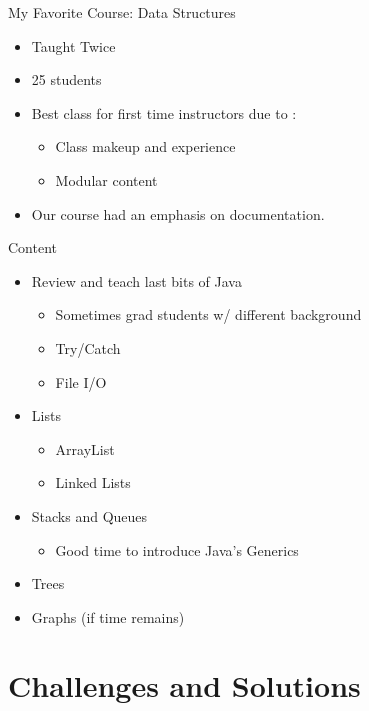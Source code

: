 \documentclass[11pt]{beamer}
\begin{document}
\begin{frame}{My Favorite Course: Data Structures}
	\begin{itemize}
		\item Taught Twice
		\item 25 students
		\item Best class for first time instructors due to :
			\begin{itemize}
				\item Class makeup and experience
				\item Modular content
			\end{itemize}
		\item Our course had an emphasis on documentation. 
	\end{itemize}
	
\end{frame}



\begin{frame}{Content}
	\begin{itemize}
		\item Review and teach last bits of Java
		
		\begin{itemize}
			\item Sometimes grad students w/ different background
			\item Try/Catch
			\item File I/O
		\end{itemize}
		\pause
		\item Lists
		\begin{itemize}
			\item ArrayList
			\item Linked Lists
		\end{itemize}
		\pause
		\item Stacks and Queues
		\begin{itemize}
			\item Good time to introduce Java's Generics
		\end{itemize}
		\pause
		\item Trees
		\pause
		\item Graphs (if time remains)
	\end{itemize}
\end{frame}

\section{Challenges and Solutions}
\end{document}
